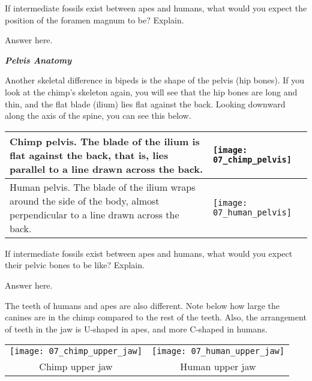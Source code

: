 \documentclass[12pt, hidelinks]{exam}
\newcommand*\AnswerBox[2]{%
    \parbox[t][#1]{0.92\textwidth}{%
    \begin{solution}#2\end{solution}}
}
\begin{document}
\begin{questions}
\question[2]\label{foramen_prediction}
If intermediate fossils exist between apes and humans, what
would you expect the position of the foramen magnum to be? Explain.

\AnswerBox{4\baselineskip}{%
Answer here.
}


\emph{\textbf{Pelvis Anatomy}}

Another skeletal difference in bipeds is the shape of the pelvis (hip bones). If
you look at the chimp's skeleton again, you will see that the hip bones
are long and thin, and the flat blade (ilium) lies flat against the
back. Looking downward along the axis of the spine, you can see this
below.

\begin{longtable}[c]{@{}L{0.35\textwidth}L{0.6\textwidth}@{}}
\toprule
Chimp pelvis. The blade of the ilium is flat against the back, that is,
lies parallel to a line drawn across the back. &

\texttt{[image: 07\_chimp\_pelvis]}\tabularnewline
\midrule

Human pelvis. The blade of the ilium wraps around the side of the body,
almost perpendicular to a line drawn across the back.

 &
\texttt{[image: 07\_human\_pelvis]} \tabularnewline

\bottomrule
\end{longtable}

\question[2]\label{pelvic_prediction}
If intermediate fossils exist between apes and humans, what
would you expect their pelvic bones to be like? Explain.

\AnswerBox{3\baselineskip}{%
Answer here.
}

The teeth of humans and apes are also different. Note below how large
the canines are in the chimp compared to the rest of the teeth. Also,
the arrangement of teeth in the jaw is {\sffamily U}-shaped in apes, 
and more {\sffamily C}-shaped in humans.

\begin{longtable}[c]{@{}cc@{}}
\toprule
\texttt{[image: 07\_chimp\_upper\_jaw]} &
\texttt{[image: 07\_human\_upper\_jaw]} \tabularnewline
Chimp upper jaw &
Human upper jaw \tabularnewline
\bottomrule
\end{longtable}


\end{questions}
\end{document}
